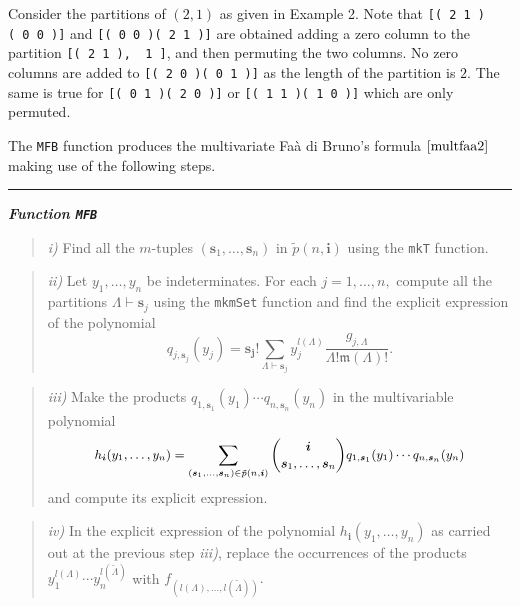 Consider the partitions of \((2,1)\) as given in Example 2. Note that \texttt{{[}(\ 2\ 1\ )(\ 0\ 0\ ){]}} and \texttt{{[}(\ 0\ 0\ )(\ 2\ 1\ ){]}} are obtained adding a zero column to the partition \texttt{{[}(\ 2\ 1\ ),\ \ 1\ {]}}, and then permuting the two columns. No zero columns are added to \texttt{{[}(\ 2\ 0\ )(\ 0\ 1\ ){]}} as the length of the partition is \(2.\) The same is true for \texttt{{[}(\ 0\ 1\ )(\ 2\ 0\ ){]}} or \texttt{{[}(\ 1\ 1\ )(\ 1\ 0\ ){]}} which are only permuted.

The \texttt{MFB} function produces the multivariate Faà di Bruno's formula \(\eqref{multfaa2}\) making use of the following steps.

\noindent

\rule{13cm}{0.4pt}

\textbf{\emph{Function \texttt{MFB}}}

\begin{quote}
\emph{i)} Find all the \(m\)-tuples \((\boldsymbol{s}_1,\ldots,\boldsymbol{s}_n)\) in \(\tilde{p}(n,\boldsymbol{i})\) using the \texttt{mkT} function.
\end{quote}

\begin{quote}
\emph{ii)} Let \(y_1, \ldots, y_n\) be indeterminates. For each \(j=1, \ldots, n,\) compute all the partitions \(\Lambda \vdash \boldsymbol{s}_j\) using the \texttt{mkmSet} function and find the explicit expression of the polynomial
\[
q_{j,\boldsymbol{s}_j}(y_j) = \boldsymbol{\boldsymbol{s}_j}! \sum_{{\Lambda} \vdash \boldsymbol{s}_j} y_j^{l(\Lambda)} \frac{g_{j, \Lambda}}{\Lambda!\mathfrak{m}(\Lambda)!}.
\]
\end{quote}

\begin{quote}
\emph{iii)} Make the products \(q_{1,\boldsymbol{s}_1}(y_1) \cdots q_{n,\boldsymbol{s}_n}(y_n)\) in the multivariable polynomial
\[{\small h_{\boldsymbol{i}}(y_1, \ldots, y_n)=\sum_{(\boldsymbol{s}_1,\ldots,\boldsymbol{s}_n) \in \tilde{p}(n,\boldsymbol{i})} {\boldsymbol{i} \choose \boldsymbol{s}_1,\ldots,\boldsymbol{s}_n} q_{1,\boldsymbol{s}_1}(y_1) \cdots q_{n,\boldsymbol{s}_n}(y_n)}\]
and compute its explicit expression.
\end{quote}

\begin{quote}
\emph{iv)} In the explicit expression of the polynomial \(h_{\boldsymbol{i}}(y_1, \ldots, y_n)\) as carried out at the previous step \emph{iii)}, replace the occurrences of the products \(y_1^{l(\Lambda)} \cdots y_n^{l(\tilde{\Lambda})}\) with \(f_{(l(\Lambda),\ldots,l(\tilde{\Lambda}))}.\)
\end{quote}

